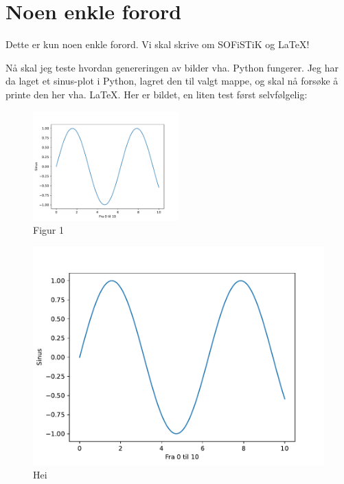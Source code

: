 \section{Noen enkle forord} \label{sec: forord}

Dette er kun noen enkle forord. 
Vi skal skrive om SOFiSTiK og \LaTeX!

Nå skal jeg teste hvordan genereringen av bilder vha. Python fungerer. Jeg har da laget et sinus-plot i Python,
lagret den til valgt mappe, og skal nå forsøke å printe den her vha. \LaTeX. Her er bildet, en liten test først selvfølgelig:

\begin{figure}[h]
    \centering
    \includegraphics[width=0.5\textwidth]{0 FIGURER/sinus}
    \caption{Figur 1}
    \label{fig:figure}
\end{figure}


\begin{figure}[h]
    \centering
    \includegraphics[width=0.5\linewidth]{0 FIGURER/sinus.pdf}
    \caption{Hei}
    \label{fig:hei}
\end{figure}
